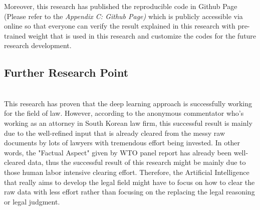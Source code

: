 \documentclass[sigconf]{acmart}
\begin{document}
Moreover, this research has published the reproducible code in Github Page (Please refer to the \textit{Appendix C: Github Page)} which is publicly accessible via online so that everyone can verify the result explained in this research with pre-trained weight that is used in this research and customize the codes for the future research development.



\subsection{Further Research Point}\\
This research has proven that the deep learning approach is successfully working for the field of law. However, according to the anonymous commentator who's working as an attorney in South Korean law firm, this successful result is mainly due to the well-refined input that is already cleared from the messy raw documents by lots of lawyers with tremendous effort being invested. In other words, the "Factual Aspect" given by WTO panel report has already been well-cleared data, thus the successful result of this research might be mainly due to those human labor intensive clearing effort. Therefore, the Artificial Intelligence that really aims to develop the legal field might have to focus on how to clear the raw data with less effort rather than focusing on the replacing the legal reasoning or legal judgment.



\end{document}
